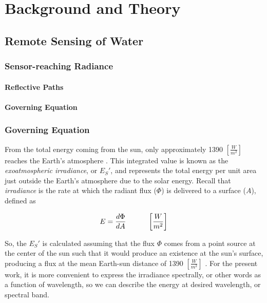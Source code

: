 \chapter{ Background and Theory}
\label{ch:background}
\section{Remote Sensing of Water}
\subsection{Sensor-reaching Radiance}
\subsubsection{Reflective Paths}
\subsubsection{Governing Equation}

\subsection{Governing Equation}

From the total energy coming from the sun, only approximately 1390 $\left[\frac{W}{m^2}\right]$ reaches the Earth's atmosphere \cite{Schott}. This integrated value is known as the \emph{exoatmospheric irradiance}, or $E_S'$, and represents the total energy per unit area just outside the Earth's atmosphere due to the solar energy. Recall that \emph{irradiance} is the rate at which the radiant flux ($\Phi$) is delivered to a surface ($A$), defined as

\begin{equation} \label{eq:irradiance}
E = \frac{d\Phi}{dA}   \indent   \indent  \left[\frac{W}{m^2}\right]  
\end{equation} 

So, the $E_S'$ is calculated assuming that the flux $\Phi$ comes from a point source at the center of the sun such that it would produce an existence at the sun's surface, producing a flux at the mean Earth-sun distance of 1390 $\left[\frac{W}{m^2}\right]$ . For the present work, it is more convenient to express the irradiance spectrally, or other words as a function of wavelength, so we can describe the energy at desired wavelength, or spectral band.


